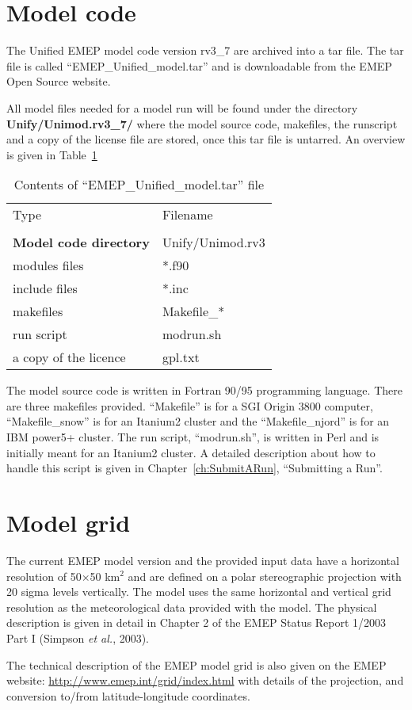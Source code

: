 \section{Model code}
\label{sec:ModelCode}

The Unified EMEP model code version rv3\_7 are archived into a tar file. 
The tar file is called ``EMEP\_Unified\_model.tar'' and is downloadable from
the EMEP Open Source website.

All model files needed for a model run will be found under the
directory {\bf Unify/Unimod.rv3\_7/} where the model source code, 
makefiles, the runscript and a copy of the license file are stored, 
once this tar file is untarred. An overview is given in 
Table~\ref{Tab:modelfiles}

\begin{table}[h]
\begin{center}
\caption{Contents of ``EMEP\_Unified\_model.tar'' file
   \label{Tab:modelfiles}}
\begin{tabular}{ll}
& \\
\hline
Type      & Filename          \\
\hline
& \\
{\bf Model code directory} & Unify/Unimod.rv3 \\ 
\hline
modules files & *.f90 \\
include files & *.inc \\
makefiles & Makefile\_* \\
run script & modrun.sh \\
a copy of the licence & gpl.txt \\
\hline
\end{tabular}
\end{center}
\end{table}

The model source code is written in Fortran 90/95 programming language.
There are three makefiles provided. ``Makefile'' is for a SGI Origin 3800
computer, ``Makefile\_snow'' is for an Itanium2 cluster and the
``Makefile\_njord'' is for an IBM power5+ cluster. The run script, 
``modrun.sh'', is written in Perl and is initially meant for an Itanium2
cluster. A detailed description about  how to handle this script
is given in Chapter~\ref{ch:SubmitARun}, ``Submitting a Run''.  


\section{Model grid}
\label{sec:ModelGrid}

The current EMEP model version and the provided input data
have a horizontal resolution of 50$\times$50 km$^2$ and are defined on a
polar stereographic projection with 20 sigma levels vertically. 
The model uses the same horizontal and vertical grid resolution as the 
meteorological data provided with the model. The physical
description is given in detail in Chapter 2 of the EMEP Status Report
1/2003 Part I (Simpson {\sl et al.}, 2003).

The technical description of the EMEP model grid is also given on the 
EMEP website:
\url{http://www.emep.int/grid/index.html} with details of the projection, and
conversion to/from latitude-longitude coordinates.
